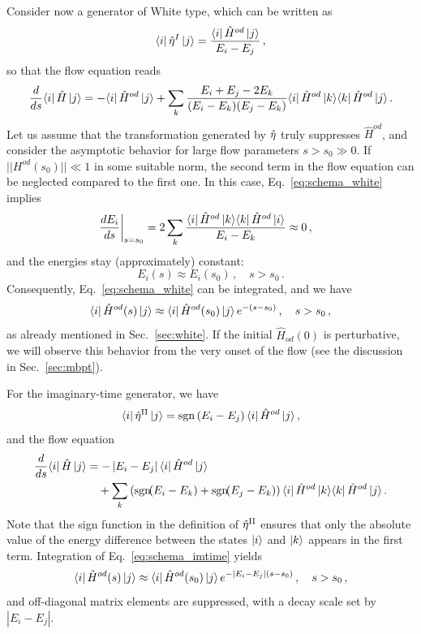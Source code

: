 Consider now a generator of White type, which can be written as
\begin{equation}
  \langle{i}|\,{\hat{\eta}^I}\,|{j}\rangle=\frac{\langle{i}|\,{\hat{H}^{od}}\,|{j}\rangle}{E_i-E_j}\,,
\end{equation}
so that the flow equation reads
\begin{align}
  \totd{}{s}\matrixe{i}{\hat{H}}{j}
  =-\matrixe{i}{\hat{H}^{od}}{j}
  +\sum_k\frac{E_i+E_j-2E_k}{(E_i-E_k)(E_j-E_k)}\matrixe{i}{\hat{H}^{od}}{k}\matrixe{k}{\hat{H}^{od}}{j}\,.\label{eq:schema_white}
\end{align}
Let us assume that the transformation generated by $\hat{\eta}$ truly suppresses $\hat{H}^{od}$, and consider the asymptotic behavior for large flow parameters $s>s_0\gg0$. If $||H^{od}(s_0)||\ll 1$ in some suitable norm, the second term in the flow equation can be neglected compared to the first one. In this case, Eq.~\eqref{eq:schema_white} implies
\begin{align}
  \left. \frac{d {E_i}} {d {s}} \right|_{s=s_0}&=2\sum_k\frac{\langle{i}|\,{\hat{H}^{od}}\,|{k}\rangle\langle{k}|\,{\hat{H}^{od}}\,|{i}\rangle}{E_i-E_k}
  \approx0\,,
\end{align}
and the energies stay (approximately) constant:
\begin{equation}
  E_i(s) \approx E_i(s_0)\,,\quad s>s_0\,.
\end{equation}
Consequently, Eq.~\eqref{eq:schema_white} can be integrated, and we have
\begin{equation}
  \langle{i}|\,{\hat{H}^{od}(s)}\,|{j}\rangle \approx \langle{i}|\,{\hat{H}^{od}(s_0)}\,|{j}\rangle\,e^{-(s-s_0)}\,,\quad s>s_0\,,
\end{equation}
as already mentioned in Sec.~\ref{sec:white}. If the initial $\hat{H}_{od}(0)$ is perturbative, we will observe this behavior from the very onset of the flow (see the discussion in Sec.~\ref{sec:mbpt}).

For the imaginary-time generator, we have
\begin{equation}
  \langle{i}|\,{\hat{\eta}^\text{II}}\,|{j}\rangle=\mathrm{sgn}\left(E_i-E_j\right)\langle{i}|\,{\hat{H}^{od}}\,|{j}\rangle\,,
\end{equation}
and the flow equation
\begin{align}
  \totd{}{s}\matrixe{i}{\hat{H}}{j}
  &=-\left|E_i-E_j\right|\matrixe{i}{\hat{H}^{od}}{j}\notag\\
  &\quad
    +\sum_k\left(\mathrm{sgn}\!\!\left(E_i-E_k\right)+\mathrm{sgn}\!\!\left(E_j-E_k\right)\right)\matrixe{i}{\hat{H}^{od}}{k}\matrixe{k}{\hat{H}^{od}}{j}\,.
    \label{eq:schema_imtime}
\end{align}
Note that the sign function in the definition of $\hat{\eta}^\text{II}$ ensures that only the absolute value of the energy difference between the states $\ket{i}$ and $\ket{k}$ appears in the first term. Integration of Eq.~\eqref{eq:schema_imtime} yields
\begin{equation}
  \langle{i}|\,{\hat{H}^{od}(s)}\,|{j}\rangle \approx \langle{i}|\,{\hat{H}^{od}(s_0)}\,|{j}\rangle\,e^{-|E_i-E_j|(s-s_0)}\,, \quad s>s_0\,,
\end{equation}
and off-diagonal matrix elements are suppressed, with a decay scale set by $|E_i-E_j|$.

